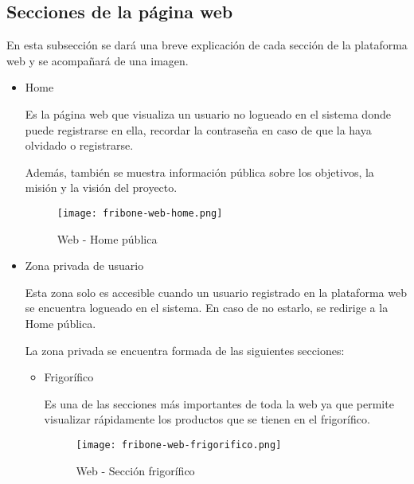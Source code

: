 \subsection{Secciones de la página web}

    En esta subsección se dará una breve explicación de cada sección de la plataforma web y se acompañará de una imagen.

    \begin{itemize}
        \item Home

        Es la página web que visualiza un usuario no logueado en el sistema donde puede registrarse en ella, recordar la contraseña en caso de que la haya olvidado o registrarse.

        Además, también se muestra información pública sobre los objetivos, la misión y la visión del proyecto.

            \begin{figure}[H]
                \centering
                \texttt{[image: fribone-web-home.png]}
                \caption{Web - Home pública}\label{fig:fribone-web-home}
            \end{figure}

        \item Zona privada de usuario

            Esta zona solo es accesible cuando un usuario registrado en la plataforma web se encuentra logueado en el sistema. En caso de no estarlo, se redirige a la Home pública.

            La zona privada se encuentra formada de las siguientes secciones:

            \begin{itemize}
                \item Frigorífico

                Es una de las secciones más importantes de toda la web ya que permite visualizar rápidamente los productos que se tienen en el frigorífico.

                \begin{figure}[H]
                    \centering
                    \texttt{[image: fribone-web-frigorifico.png]}
                    \caption{Web - Sección frigorífico}\label{fig:fribone-web-frigorifico}
                \end{figure}



\end{itemize}
\end{itemize}
